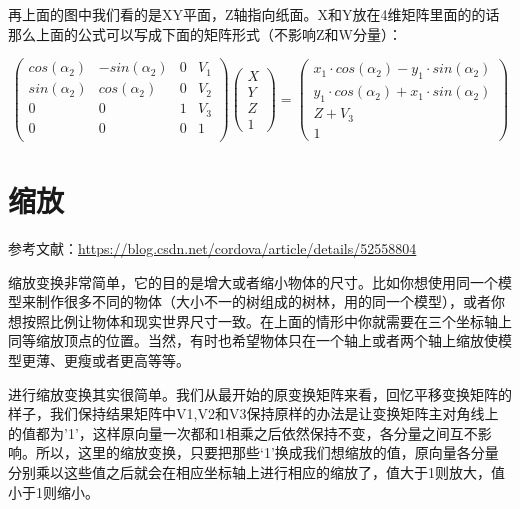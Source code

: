 \documentclass[UTF8,a4paper,12pt]{ctexbook}
\begin{document}
		
		再上面的图中我们看的是XY平面，Z轴指向纸面。X和Y放在4维矩阵里面的的话那么上面的公式可以写成下面的矩阵形式（不影响Z和W分量）：
		
		\begin{equation}
		\left(
		\begin{array}{cccc}
		cos(\alpha_2) & -sin(\alpha_2) & 0& V_1\\
		
		sin(\alpha_2) & cos(\alpha_2) & 0& V_2\\
		
		0 & 0 & 1& V_3\\
		
		0 & 0 & 0& 1\\
		\end{array}
		\right)
		\left(
		\begin{array}{c}
		X\\ 
		Y\\
		Z\\
		1 
		\end{array}	
		\right) 
		=
		\left(
		\begin{array}{c}
		x_1\cdot cos(\alpha_2) - y_1\cdot sin(\alpha_2)\\ 
		y_1\cdot cos(\alpha_2) + x_1\cdot sin(\alpha_2)\\
		Z+V_3\\
		1 
		\end{array}	
		\right)
		\end{equation}
	\section{缩放}
		参考文献：\url{https://blog.csdn.net/cordova/article/details/52558804}

		缩放变换非常简单，它的目的是增大或者缩小物体的尺寸。比如你想使用同一个模型来制作很多不同的物体（大小不一的树组成的树林，用的同一个模型），或者你想按照比例让物体和现实世界尺寸一致。在上面的情形中你就需要在三个坐标轴上同等缩放顶点的位置。当然，有时也希望物体只在一个轴上或者两个轴上缩放使模型更薄、更瘦或者更高等等。
		
		进行缩放变换其实很简单。我们从最开始的原变换矩阵来看，回忆平移变换矩阵的样子，我们保持结果矩阵中V1,V2和V3保持原样的办法是让变换矩阵主对角线上的值都为’1’，这样原向量一次都和1相乘之后依然保持不变，各分量之间互不影响。所以，这里的缩放变换，只要把那些‘1’换成我们想缩放的值，原向量各分量分别乘以这些值之后就会在相应坐标轴上进行相应的缩放了，值大于1则放大，值小于1则缩小。
		
\end{document}
